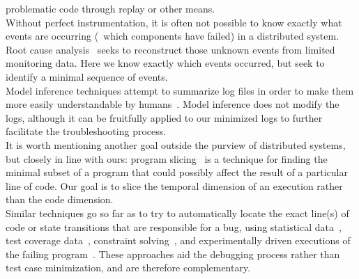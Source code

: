 problematic code through replay or other means.\\[0.5ex]
%
 Without perfect instrumentation,
it is often not possible to know exactly what events are occurring (\eg~which
components have failed) in a
distributed system. Root cause analysis~\cite{yemini1996,Kandula:2009:DDE:1592568.1592597}
seeks to reconstruct those unknown events from limited monitoring data.
Here we know exactly which events occurred, but
seek to identify a minimal sequence of events.\\[0.5ex]
%
 Model inference techniques attempt to summarize log files
in order to make them more easily understandable by
humans~\cite{synoptic,csight,biermann1972synthesis,lorenzoli2008automatic,lou2010mining}.
Model inference does not modify the logs, although
it can be fruitfully applied to our minimized logs to further facilitate the
troubleshooting process.\\[0.5ex]
%
 It is worth mentioning another goal outside the purview of distributed systems, but
closely in line with ours: program slicing~\cite{weiser1981program} is a
technique for finding the
minimal subset of a program that could possibly affect the result of a particular line of code.
Our goal is to slice the temporal dimension of an execution rather than the
code dimension.\\[0.5ex]
%
 Similar techniques go so far as to try to
automatically locate the exact line(s) of code or state transitions that are responsible for a
bug, using statistical data~\cite{zhangzhang}, test coverage
data~\cite{coverage_localization}, constraint solving~\cite{jose11}, and
experimentally driven executions of the failing program~\cite{zeller2005,comparative_causality}.
These approaches aid the debugging process rather than test case minimization,
and are therefore complementary.
